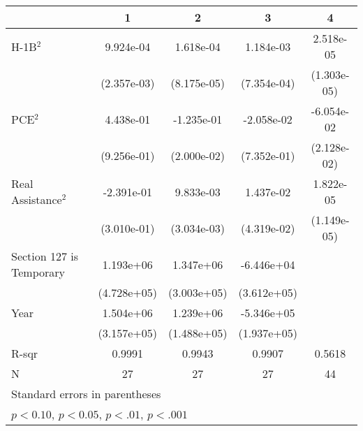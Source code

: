 
\begin{tabular}{l*{4}{c}}
    \toprule
                             & \multicolumn{1}{c}{1} & \multicolumn{1}{c}{2} & \multicolumn{1}{c}{3} & \multicolumn{1}{c}{4} \\
    \midrule
    H-1B$^2$                 & 9.924e-04             & 1.618e-04\sym{+}      & 1.184e-03             & 2.518e-05\sym{+}      \\
                             & (2.357e-03)           & (8.175e-05)           & (7.354e-04)           & (1.303e-05)           \\
    \addlinespace
    PCE$^2$                  & 4.438e-01             & -1.235e-01\sym{**}    & -2.058e-02            & -6.054e-02\sym{*}     \\
                             & (9.256e-01)           & (2.000e-02)           & (7.352e-01)           & (2.128e-02)           \\
    \addlinespace
    Real Assistance$^2$      & -2.391e-01            & 9.833e-03\sym{*}      & 1.437e-02             & 1.822e-05             \\
                             & (3.010e-01)           & (3.034e-03)           & (4.319e-02)           & (1.149e-05)           \\
    \addlinespace
    Section 127 is Temporary & 1.193e+06\sym{++}     & 1.347e+06\sym{**}     & -6.446e+04            &                       \\
                             & (4.728e+05)           & (3.003e+05)           & (3.612e+05)           &                       \\
    \addlinespace
    Year                     & 1.504e+06\sym{*}      & 1.239e+06\sym{**}     & -5.346e+05\sym{+}     &                       \\
                             & (3.157e+05)           & (1.488e+05)           & (1.937e+05)           &                       \\
    \midrule
    R-sqr                    & 0.9991                & 0.9943                & 0.9907                & 0.5618                \\
    N                        & 27                    & 27                    & 27                    & 44                    \\
    \bottomrule
    \multicolumn{5}{l}{\footnotesize Standard errors in parentheses}                                                         \\
    \multicolumn{5}{l}{\footnotesize \sym{+} \(p<0.10\), \sym{++} \(p<0.05\), \sym{*} \(p<.01\), \sym{**} \(p<.001\)}        \\
\end{tabular}